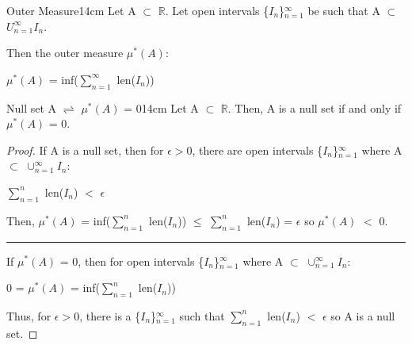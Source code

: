     \vspace{0.5cm}



    \begin{definition}{Outer Measure}{14cm}
        Let A $\subset$ $\mathbb{R}$.
        Let open intervals \{$I_n$\}$_{n=1}^{\infty}$ be such that
        A $\subset$ $U_{n=1}^{\infty} I_n$.

        Then the {\color{lblue} outer measure} $\mu^*(A)$:

        \hspace{0.5cm}
        $\mu^*(A)$
        = inf($\sum_{n=1}^{\infty}$ len($I_n$))
    \end{definition}

    \vspace{0.5cm}



    \begin{wtheorem}{Null set A $\rightleftharpoons$ $\mu^*(A)$ = 0}{14cm}
        Let A $\subset$ $\mathbb{R}$.
        Then, A is a null set if and only if $\mu^*(A)$ = 0.
    \end{wtheorem}

    \begin{proof}
        If A is a null set, then for $\epsilon > 0$, there
        are open intervals \{$I_n$\}$_{n=1}^{\infty}$
        where A $\subset$ $\cup_{n=1}^{\infty} I_n$:

        \hspace{0.5cm}
        $\sum_{n=1}^n$ len($I_n$) $<$ $\epsilon$

        Then, $\mu^*(A)$
        = inf($\sum_{n=1}^n$ len($I_n$))
        $\leq$ $\sum_{n=1}^n$ len($I_n$)
        = $\epsilon$ so $\mu^*(A)$ $<$ 0.

        \rule[0.1cm]{15.2cm}{0.01cm}

        If $\mu^*(A)$ = 0, then
        for open intervals \{$I_n$\}$_{n=1}^{\infty}$
        where A $\subset$ $\cup_{n=1}^{\infty} I_n$:

        \hspace{0.5cm}
        0
        = $\mu^*(A)$
        = inf($\sum_{n=1}^n$ len($I_n$))
        
        Thus, for $\epsilon > 0$, there is a \{$I_n$\}$_{n=1}^{\infty}$ such that
        $\sum_{n=1}^n$ len($I_n$) $<$ $\epsilon$ so A is a null set.
    \end{proof}

    \vspace{0.5cm}



